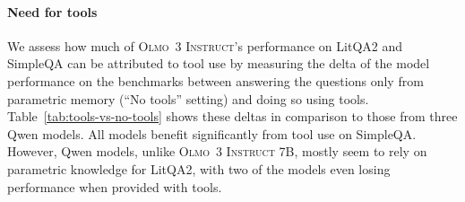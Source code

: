 \documentclass[table]{ai2style/ai2}
\newcommand{\newOlmo}{Olmo\xspace}
\newcommand{\olmothreeinstruct}{\textsc{\newOlmo~3 Instruct}\xspace}
\begin{document}
{{\paragraph{Need for tools} We assess how much of \olmothreeinstruct's performance on LitQA2 and SimpleQA can be attributed to tool use by measuring the delta of the model performance on the benchmarks between answering the questions only from parametric memory (``No tools'' setting) and doing so using tools. Table~\ref{tab:tools-vs-no-tools} shows these deltas in comparison to those from three Qwen models. All models benefit significantly from tool use on SimpleQA. However, Qwen models, unlike \olmothreeinstruct 7B, mostly seem to rely on parametric knowledge for LitQA2, with two of the models even losing performance when provided with tools.
\begin{table}[t]
\centering
\setlength\tabcolsep{5pt}
\renewcommand{\arraystretch}{1.2}
\caption{\textbf{Comparison of agents' performance with and without access to tools on LitQA2 and SimpleQA}. ASC refers to Asta Scientific Corpus tools and SBT refers to search and browsing tools.}
\label{tab:tools-vs-no-tools}
\end{table}

}}
\end{document}

